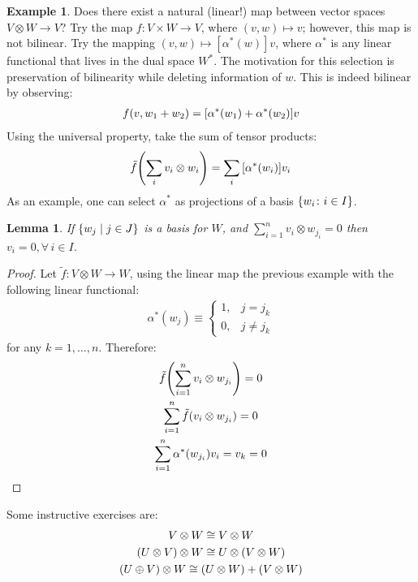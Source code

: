 \documentclass{article}
\newtheorem{Lemma}{Lemma}
\theoremstyle{definition}
\newtheorem*{Example*}{Example}
\theoremstyle{remark}
\theoremstyle{underline}
\theoremstyle{underline}
\begin{document}
	\begin{Example*}
		Does there exist a natural (linear!) map between vector spaces $V \otimes W \to V$? Try the map $f \colon V \times W \to V$, where $(v, w) \mapsto v$; however, this map is not bilinear. Try the mapping $(v,w) \mapsto [\alpha^*(w)]v$, where $\alpha^*$ is any linear functional that lives in the dual space $W^*$. The motivation for this selection is preservation of	bilinearity while deleting information of $w$. This is indeed bilinear by observing:
		\begin{gather*}
			f(v, w_1 + w_2) = \bqty{\alpha^*(w_1) + \alpha^*(w_2)}v
		\end{gather*}
		Using the universal property, take the sum of tensor products:
		\begin{gather*}
			\tilde f\pqty{\sum_{i} v_i \otimes w_i} = \sum_i \bqty{\alpha^*(w_i)}v_i
		\end{gather*}
		As an example, one can select $\alpha^*$ as projections of a basis $\qty{w_i \colon i \in I}$.
	\end{Example*}

		\begin{Lemma}\label{lem:tensProdBasis}
		If $\qty{w_j \mid j \in J}$ is a basis for $W$, and $ \sum\limits_{i=1}^n v_i \otimes w_{j_i} = 0 $	then $v_i = 0, \forall\,i \in I$.
	\end{Lemma}
	\begin{proof}
		Let $\tilde f \colon V \otimes W \to W$, using the linear map the previous example with the following linear functional:
		\begin{gather*}
			\alpha^*(w_j) \equiv 
			\begin{cases}
		        1, & j = j_k \\
		        0, & j \neq j_k 
	        \end{cases}
		\end{gather*}
		for any $k = 1, \ldots, n$. Therefore:
		\begin{gather*}
			\tilde f \pqty{\sum_{i=1}^n v_i \otimes w_{j_i}} = 0\\
			\sum_{i=1}^n \tilde f\pqty{v_i \otimes w_{j_i}} = 0 \\
			\sum_{i=1}^n \alpha^*\pqty{w_{j_i}} v_i = v_k = 0
		\end{gather*}
	\end{proof}

	Some instructive exercises are:
	\begin{gather*}
		V \otimes W \cong V \otimes W \\
		\pqty{U \otimes V} \otimes W \cong U \otimes \pqty{V \otimes W} \\
		\pqty{U \oplus V} \otimes W \cong \pqty{U \otimes W} + \pqty{V \otimes W} 
	\end{gather*}
\end{document}
